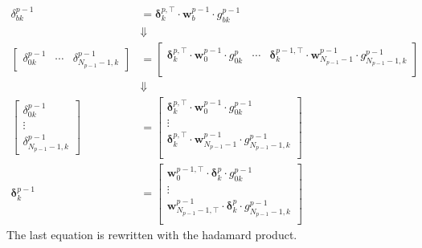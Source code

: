 \begin{align}
	\label{eq:backprop-vectorized2}
	\delta_{bk}^{p-1}&=\boldsymbol{\delta}_k^{p,\top}\cdot \boldsymbol{w}_b^{p-1}\cdot  g_{bk}^{p-1}\\
	&\Downarrow\nonumber\\ 
	\begin{bmatrix}
		\delta_{0k}^{p-1}&\cdots&\delta_{N_{p-1}-1,k}^{p-1}
	\end{bmatrix}&=	\begin{bmatrix}
		\boldsymbol{\delta}_k^{p,\top}\cdot \boldsymbol{w}_0^{p-1}\cdot  g_{0k}^{p}&\cdots&\boldsymbol{\delta}_k^{p-1,\top}\cdot \boldsymbol{w}_{N_{p-1}-1}^{p-1}\cdot  g_{N_{p-1}-1,k}^{p-1}\\
	\end{bmatrix}\\
	&\Downarrow\nonumber\\ 
	\begin{bmatrix}
		\delta_{0k}^{p-1}\\\vdots\\\delta_{N_{p-1}-1,k}^{p-1}
	\end{bmatrix}&=	\begin{bmatrix}
		\boldsymbol{\delta}_k^{p,\top}\cdot \boldsymbol{w}_0^{p-1}\cdot  g_{0k}^{p-1}\\\vdots\\\boldsymbol{\delta}_k^{p,\top}\cdot \boldsymbol{w}_{N_{p-1}-1}^{p-1}\cdot  g_{N_{p-1}-1,k}^{p-1}\\
	\end{bmatrix}\\
	\boldsymbol{\delta}_k^{p-1}&=\begin{bmatrix}
		\boldsymbol{w}_0^{p-1,\top}\cdot \boldsymbol{\delta}_k^{p}\cdot  g_{0k}^{p-1}\\\vdots\\ \boldsymbol{w}_{N_{p-1}-1,\top}^{p-1}\cdot\boldsymbol{\delta}_k^{p}\cdot  g_{N_{p-1}-1,k}^{p-1}\\
	\end{bmatrix}
\end{align}
The last equation is rewritten with the hadamard product.
